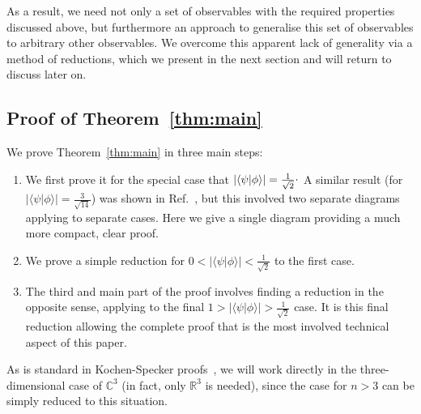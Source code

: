 \documentclass[%
 superscriptaddress,
 preprint,
 showpacs,
 showkeys,
 nofootinbib,
  amsmath,amssymb,
  aps,
  longbibliography,
  floatfix,
 ]{revtex4-1}
\theoremstyle{definition}
\newcommand{\R}{\mathbb{R}}%
\newcommand{\C}{\mathbb{C}}
\newcommand{\iprod}[2]{\langle #1 | #2 \rangle}
\begin{document}
As a result, we need not only a set of observables with the required properties discussed above, but furthermore an approach to generalise this set of observables to arbitrary other observables.
We overcome this apparent lack of generality via a method of reductions, which we present in the next section and will return to discuss later on.


\subsection{Proof of Theorem~\ref{thm:main}}

We prove Theorem~\ref{thm:main} in three main steps:
\begin{enumerate}
	\item We first prove it for the special case that $|\iprod{\psi}{\phi}|=\frac{1}{\sqrt{2}}\raisebox{.8mm}{.}$
		A similar result (for $|\iprod{\psi}{\phi}|=\frac{3}{\sqrt{14}}$) was shown in Ref.~\cite{Abbott:2012fk}, but this involved two separate diagrams applying to separate cases.
		Here we give a single diagram providing a much more compact, clear proof.
	\item We prove a simple reduction for $0 < |\iprod{\psi}{\phi}|<\frac{1}{\sqrt{2}}$ to the first case.
	\item The third and main part of the proof involves finding a reduction in the opposite sense, applying to the final $1 > |\iprod{\psi}{\phi}|>\frac{1}{\sqrt{2}}$ case.
		It is this final reduction allowing the complete proof that is the most involved technical aspect of this paper.
\end{enumerate}


As is standard in Kochen-Specker proofs~\cite{Cabello:1994ly}, we will work directly in the three-dimensional case of $\C^3$ (in fact, only $\R^3$ is needed), since the case for $n>3$ can be simply reduced to this situation.
\end{document}
